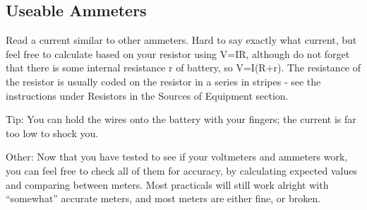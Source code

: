 \subsection{Useable Ammeters}
Read a current similar to other ammeters. 
Hard to say exactly what current, 
but feel free to calculate based on your resistor using V=IR, 
although do not forget that there is 
some internal resistance r of battery, 
so V=I(R+r). 
The resistance of the resistor is usually coded 
on the resistor in a series in stripes - 
see the instructions under Resistors in the Sources of Equipment section.

Tip: You can hold the wires onto the battery with your fingers; 
the current is far too low to shock you.

Other: Now that you have tested to see 
if your voltmeters and ammeters work, 
you can feel free to check all of them for accuracy, 
by calculating expected values and comparing between meters. 
Most practicals will still work alright with “somewhat” accurate meters, 
and most meters are either fine, 
or broken.
